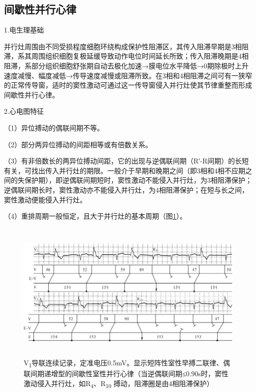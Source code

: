 \protect\hypertarget{text00023.htmlux5cux23subid290}{}{}

\subsection{间歇性并行心律}

1.电生理基础

并行灶周围由不同受损程度细胞环绕构成保护性阻滞区，其传入阻滞早期是3相阻滞，系其周围组织细胞复极延缓导致动作电位时间延长所致；传入阻滞晚期是4相阻滞，系部分组织细胞舒张期自动去极化加速→膜电位水平降低→0期除极时上升速度减慢、幅度减低→传导速度减慢或阻滞所致。在3相和4相阻滞之间可有一狭窄的正常传导窗，适时的窦性激动可通过这一传导窗侵入并行灶使其节律重整而形成间歇性并行心律。

2.心电图特征

（1）异位搏动的偶联间期不等。

（2）部分两异位搏动的间距相等或有倍数关系。

（3）有非倍数长的两异位搏动间距，它的出现与逆偶联间期（R′-R间期）的长短有关，可找出传入并行灶的期限。一般介于早期和晚期之间（即3相和4相不应期之间的失保护期），即逆偶联间期短时，窦性激动不能侵入并行灶，为3相阻滞保护；逆偶联间期长时，窦性激动亦不能侵入并行灶，为4相阻滞保护；在短与长之间，窦性激动便能侵入并行灶。

（4）重排周期一般恒定，且大于并行灶的基本周期（图\ref{fig16-14}）。

\begin{figure}[!htbp]
 \centering
 \includegraphics[width=5.73958in,height=2.70833in]{./images/Image00290.jpg}
 \captionsetup{justification=centering}
 \caption{V\textsubscript{1}导联连续记录，定准电压0.5mV。显示短阵性室性早搏二联律、偶联间期递增型的间歇性室性并行心律（当逆偶联间期≤0.90s时，窦性激动侵入并行灶，如R\textsubscript{4}、R\textsubscript{10} 搏动，阻滞圈是由4相阻滞保护）}
 \label{fig16-14}
  \end{figure} 



